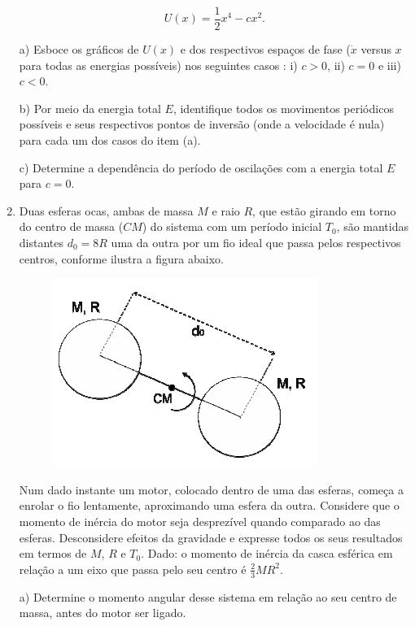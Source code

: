 \begin{enumerate}[start=1,label={\bfseries Q\arabic*.}]
$$
U(x) = \frac{1}{2} x^{4} - c x^{2}.
$$


a) Esboce os gráficos de $U(x)$ e dos respectivos espaços de fase ($\dot{x}$ versus $x$ para todas as energias possíveis) nos seguintes casos : i) $c > 0$, ii) $c = 0$ e iii) $c < 0$.

\resposta

b) Por meio da energia total $E$, identifique todos os movimentos periódicos possíveis e seus respectivos pontos de inversão (onde a velocidade é nula) para cada um dos casos do item (a).

\resposta

c) Determine a dependência do período de oscilações com a energia total $E$ para $c = 0$.

\resposta



\item Duas esferas ocas, ambas de massa $M$ e raio $R$, que estão girando em torno do centro de massa ($CM$) do sistema com um período inicial $T_{0}$, são mantidas distantes $d_{0} = 8R$ uma da outra por um fio ideal que passa pelos respectivos centros, conforme ilustra a figura abaixo.
\begin{figure}[H]
\centering
\includegraphics[scale=0.8]{classica-img/rotacional.png}
\end{figure}
Num dado instante um motor, colocado dentro de uma das esferas, começa a enrolar o fio lentamente, aproximando uma esfera da outra. Considere que o momento de inércia do motor seja desprezível quando comparado ao das esferas. Desconsidere efeitos da gravidade e expresse todos os seus resultados em termos de $M$, $R$ e $T_{0}$. Dado: o momento de inércia da casca esférica em relação a um eixo que passa pelo seu centro é $\frac{2}{3} MR^{2}$.

a) Determine o momento angular desse sistema em relação ao seu centro de massa, antes do motor ser ligado.


\end{enumerate}
